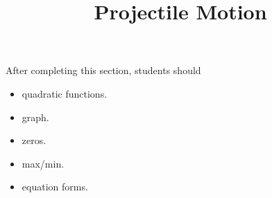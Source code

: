 \documentclass{ximera}
\title{Projectile Motion}
\begin{document}
\begin{abstract}
\end{abstract}
\maketitle

\begin{sectionOutcomes}
After completing this section, students should 

\begin{itemize}
\item quadratic functions.
\item graph.
\item zeros.
\item max/min.
\item equation forms.
\end{itemize}
\end{sectionOutcomes}
\end{document}
